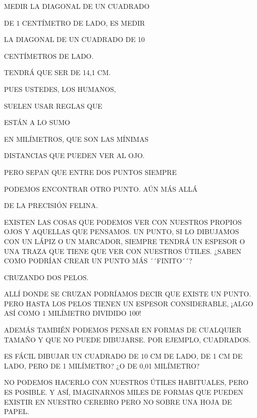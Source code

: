 MEDIR LA DIAGONAL DE UN CUADRADO

DE 1 CENTÍMETRO DE LADO, ES MEDIR 

LA DIAGONAL DE UN CUADRADO DE 10

CENTÍMETROS DE LADO.

TENDRÁ QUE SER DE 14,1 CM.

PUES USTEDES, LOS HUMANOS,

SUELEN USAR REGLAS QUE 

ESTÁN A LO SUMO

EN MILÍMETROS, QUE SON LAS MÍNIMAS

DISTANCIAS QUE PUEDEN VER AL OJO.

PERO SEPAN QUE ENTRE DOS PUNTOS SIEMPRE 

PODEMOS ENCONTRAR OTRO PUNTO. AÚN MÁS ALLÁ 

DE LA PRECISIÓN FELINA.

\newpage

EXISTEN LAS COSAS QUE PODEMOS VER CON NUESTROS PROPIOS OJOS Y AQUELLAS QUE PENSAMOS. UN PUNTO, SI LO DIBUJAMOS CON UN LÁPIZ O UN MARCADOR, SIEMPRE TENDRÁ UN ESPESOR O UNA TRAZA QUE TIENE QUE VER CON NUESTROS ÚTILES. ¿SABEN COMO PODRÍAN CREAR UN PUNTO MÁS ´´FINITO´´? 

CRUZANDO DOS PELOS.

ALLÍ DONDE SE CRUZAN PODRÍAMOS DECIR QUE EXISTE UN PUNTO. PERO HASTA LOS PELOS TIENEN UN ESPESOR CONSIDERABLE, ¡ALGO ASÍ COMO 1 MILÍMETRO DIVIDIDO 100!

ADEMÁS TAMBIÉN PODEMOS PENSAR EN FORMAS DE CUALQUIER TAMAÑO Y QUE NO PUEDE DIBUJARSE. POR EJEMPLO, CUADRADOS.

ES FÁCIL DIBUJAR UN CUADRADO DE 10 CM DE LADO, DE 1 CM DE LADO, PERO DE 1 MILÍMETRO? ¿O DE 0,01 MILÍMETRO?
\newpage
{}
\newpage
{}	
NO PODEMOS HACERLO CON NUESTROS ÚTILES HABITUALES, PERO ES POSIBLE. Y ASÍ, IMAGINARNOS MILES DE FORMAS QUE PUEDEN EXISTIR EN NUESTRO CEREBRO PERO NO SOBRE UNA HOJA DE PAPEL. 

